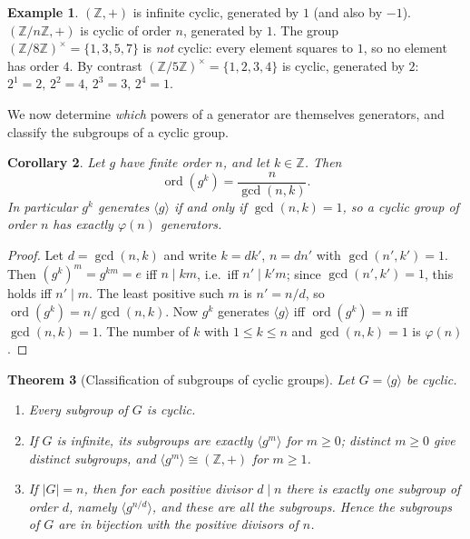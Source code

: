 \documentclass[11pt,a4paper]{article}
\newtheorem{theorem}{Theorem}[section]
\newtheorem{corollary}[theorem]{Corollary}
\theoremstyle{definition}
\newtheorem{example}[theorem]{Example}
\theoremstyle{remark}
\newcommand{\Z}{\ensuremath{\mathbb{Z}}}
\DeclareMathOperator{\ord}{ord}
\begin{document}
\begin{example}\label{groups:exa-cyclic}
\((\Z, +)\) is infinite cyclic, generated by \(1\) (and also by \(-1\)). \((\Z/n\Z, +)\) is cyclic of order \(n\), generated by \(1\). The group \((\Z/8\Z)^\times = \{1,3,5,7\}\) is \emph{not} cyclic: every element squares to \(1\), so no element has order \(4\). By contrast \((\Z/5\Z)^\times = \{1,2,3,4\}\) is cyclic, generated by \(2\): \(2^1=2,\,2^2=4,\,2^3=3,\,2^4=1\).
\end{example}

We now determine \emph{which} powers of a generator are themselves generators, and classify the subgroups of a cyclic group.

\begin{corollary}\label{groups:cor-order-power}
Let \(g\) have finite order \(n\), and let \(k \in \Z\). Then
\[
\ord(g^k) = \frac{n}{\gcd(n,k)}.
\]
In particular \(g^k\) generates \(\langle g \rangle\) if and only if \(\gcd(n,k)=1\), so a cyclic group of order \(n\) has exactly \(\varphi(n)\) generators.
\end{corollary}

\begin{proof}
Let \(d = \gcd(n,k)\) and write \(k = d k'\), \(n = d n'\) with \(\gcd(n',k')=1\). Then \((g^k)^m = g^{km} = e\) iff \(n \mid km\), i.e.\ iff \(n' \mid k' m\); since \(\gcd(n',k')=1\), this holds iff \(n' \mid m\). The least positive such \(m\) is \(n' = n/d\), so \(\ord(g^k) = n/\gcd(n,k)\). Now \(g^k\) generates \(\langle g\rangle\) iff \(\ord(g^k) = n\) iff \(\gcd(n,k)=1\). The number of \(k\) with \(1 \le k \le n\) and \(\gcd(n,k)=1\) is \(\varphi(n)\).
\end{proof}

\begin{theorem}[Classification of subgroups of cyclic groups]\label{groups:thm-cyclic-subgroups}
Let \(G = \langle g\rangle\) be cyclic.
\begin{enumerate}
\item Every subgroup of \(G\) is cyclic.
\item If \(G\) is infinite, its subgroups are exactly \(\langle g^m\rangle\) for \(m \ge 0\); distinct \(m \ge 0\) give distinct subgroups, and \(\langle g^m\rangle \cong (\Z,+)\) for \(m \ge 1\).
\item If \(|G| = n\), then for each positive divisor \(d \mid n\) there is exactly one subgroup of order \(d\), namely \(\langle g^{n/d}\rangle\), and these are all the subgroups. Hence the subgroups of \(G\) are in bijection with the positive divisors of \(n\).
\end{enumerate}
\end{theorem}
\end{document}
